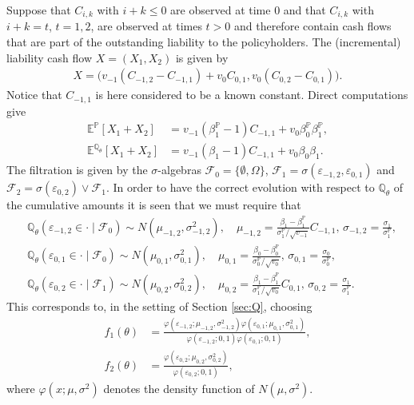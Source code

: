 \documentclass[11pt,a4paper]{article}
\newcommand{\E}{\mathbb{E}}
\renewcommand{\P}{\mathbb{P}}
\newcommand{\Q}{\mathbb{Q}}
\renewcommand{\phi}{\varphi}
\newcommand{\calF}{\mathcal{F}}
\begin{document}
Suppose that $C_{i,k}$ with $i+k\leq 0$ are observed at time $0$ and that $C_{i,k}$ with $i+k=t$, $t=1,2$, are observed at times $t>0$ and therefore contain cash flows that are part of the outstanding liability to the policyholders. 
The (incremental) liability cash flow $X=(X_1,X_2)$ is given by 
\begin{align*}
X=\bigg(v_{-1}(C_{-1,2}-C_{-1,1})+v_0C_{0,1},v_0(C_{0,2}-C_{0,1})\bigg).
\end{align*}
Notice that $C_{-1,1}$ is here considered to be a known constant. 
Direct computations give  
\begin{align*}
\E^{\P}[X_1+X_2]&=v_{-1}(\beta_1^{\P}-1)C_{-1,1}+v_0\beta_0^{\P}\beta_1^{\P}, \\ 
\E^{\Q_{\theta}}[X_1+X_2]&=v_{-1}(\beta_1-1)C_{-1,1}+v_0\beta_0\beta_1.
\end{align*}
The filtration is given by the $\sigma$-algebras $\calF_0=\{\emptyset,\Omega\}$, $\calF_1=\sigma(\varepsilon_{-1,2},\varepsilon_{0,1})$ and $\calF_2=\sigma(\varepsilon_{0,2}) \vee \calF_1$. 
In order to have the correct evolution with respect to $\Q_{\theta}$ of the cumulative amounts it is seen that we must require that 
\begin{align*}
&\Q_{\theta}(\varepsilon_{-1,2}\in \cdot\mid \calF_{0})\sim N(\mu_{-1,2},\sigma_{-1,2}^2),\quad 
\mu_{-1,2}=\frac{\beta_1-\beta_1^{\P}}{\sigma_{1}^{\P}/\sqrt{v_{-1}}}C_{-1,1}, \,
\sigma_{-1,2}=\frac{\sigma_{1}}{\sigma_{1}^{\P}}, \\
&\Q_{\theta}(\varepsilon_{0,1}\in \cdot\mid \calF_{0})\sim N(\mu_{0,1},\sigma_{0,1}^2),\quad 
\mu_{0,1}=\frac{\beta_0-\beta_0^{\P}}{\sigma_{0}^{\P}/\sqrt{v_0}}, \,
\sigma_{0,1}=\frac{\sigma_{0}}{\sigma_{0}^{\P}}, \\
&\Q_{\theta}(\varepsilon_{0,2}\in \cdot\mid \calF_{1})\sim N(\mu_{0,2},\sigma_{0,2}^2),\quad 
\mu_{0,2}=\frac{\beta_1-\beta_1^{\P}}{\sigma_{1}^{\P}/\sqrt{v_0}}C_{0,1}, \,
\sigma_{0,2}=\frac{\sigma_{1}}{\sigma_{1}^{\P}}.
\end{align*}
This corresponds to, in the setting of Section \ref{sec:Q}, choosing 
\begin{align}
f_1(\theta)&=\frac{\phi(\varepsilon_{-1,2};\mu_{-1,2},\sigma_{-1,2}^2)\phi(\varepsilon_{0,1};\mu_{0,1},\sigma_{0,1}^2)}{\phi(\varepsilon_{-1,2};0,1)\phi(\varepsilon_{0,1};0,1)}, \label{eq:f1}\\
f_2(\theta)&=\frac{\phi(\varepsilon_{0,2};\mu_{0,2},\sigma_{0,2}^2)}{\phi(\varepsilon_{0,2};0,1)}, \nonumber
\end{align}
where $\varphi(x;\mu,\sigma^2)$ denotes the density function of $N(\mu,\sigma^2)$. 
\end{document}
